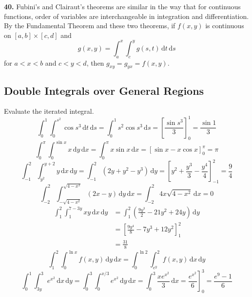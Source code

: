 \documentclass[a4paper,12pt]{article}
\newcommand{\ud}{\,\mathrm{d}}
\newcommand{\exercise}[1]{\noindent\textbf{#1.}}
\begin{document}
\exercise{40} Fubini's and Clairaut's theorems are similar in the way that
for continuous functions, order of variables are interchangeable in integration
and differentiation. By the Fundamental Theorem and these two theorems,
if $f(x, y)$ is continuous on $[a, b]\times[c, d]$ and
\[g(x, y) = \int_a^x\int_c^y g(s, t)\ud t\ud s\]
for $a < x < b$ and $c < y < d$, then $g_{xy} = g_{yx} = f(x, y)$.

\subsection{Double Integrals over General Regions}
Evaluate the iterated integral.
\[\int_0^1\int_0^{s^2}\cos s^3\ud t\ud s
= \int_0^1 s^2\cos s^3\ud s
= \left[\frac{\sin s^3}{3}\right]_0^1
= \frac{\sin 1}{3}\tag{5}\]
\[\int_0^\pi\int_0^{\sin x}x\ud y\ud x
= \int_0^\pi x\sin x\ud x
= [\sin x - x\cos x]_0^\pi
= \pi\tag{9}\]
\[\int_{-1}^2\int_{y^2}^{y+2}y\ud x\ud y
= \int_{-1}^2(2y + y^2 - y^3)\ud y
= \left[y^2 + \frac{y^3}{3} - \frac{y^4}{4}\right]_{-1}^2
= \frac{9}{4}\tag{15}\]
\[\int_{-2}^2\int_{-\sqrt{4-x^2}}^{\sqrt{4-x^2}}(2x - y)\ud y\ud x
= \int_{-2}^2 4x\sqrt{4 - x^2}\ud x
= 0\tag{21}\]
\begin{align*}
  \int_1^2\int_1^{7-3y}xy\ud x\ud y
  &= \int_1^2\left(\frac{9y^3}{2} - 21y^2 + 24y\right)\ud y\\
  &= \left[\frac{9y^4}{8} - 7y^3 + 12y^2\right]_1^2\\
  &= \frac{31}{8}\tag{25}
\end{align*}
\[\int_1^2\int_0^{\ln x} f(x, y)\ud y\ud x
= \int_0^{\ln 2}\int_{e^y}^2 f(x, y)\ud x\ud y\tag{47}\]
\[\int_0^1\int_{3y}^3 e^{x^2}\ud x\ud y
= \int_0^3\int_0^{x/3} e^{x^2}\ud y\ud x
= \int_0^3\frac{xe^{x^2}}{3}\ud x
= \left.\frac{e^{x^2}}{6}\right]_0^3
= \frac{e^9 - 1}{6}\tag{49}\]
\end{document}

